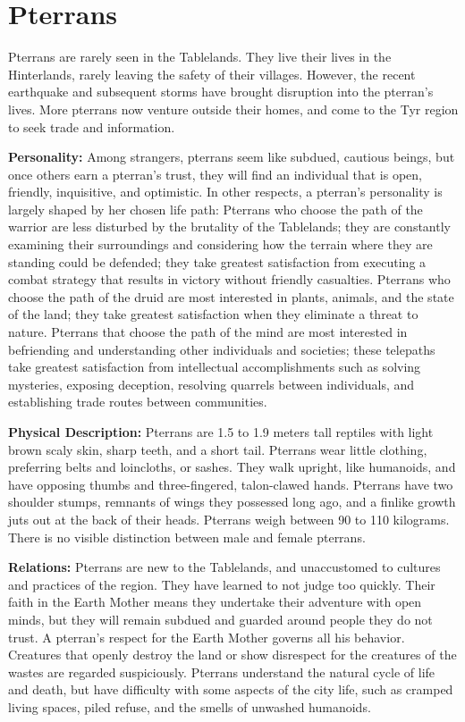\section{Pterrans}

Pterrans are rarely seen in the Tablelands. They live their lives in the Hinterlands, rarely leaving the safety of their villages. However, the recent earthquake and subsequent storms have brought disruption into the pterran's lives. More pterrans now venture outside their homes, and come to the Tyr region to seek trade and information.

\textbf{Personality:} Among strangers, pterrans seem like subdued, cautious beings, but once others earn a pterran's trust, they will find an individual that is open, friendly, inquisitive, and optimistic. In other respects, a pterran's personality is largely shaped by her chosen life path: Pterrans who choose the path of the warrior are less disturbed by the brutality of the Tablelands; they are constantly examining their surroundings and considering how the terrain where they are standing could be defended; they take greatest satisfaction from executing a combat strategy that results in victory without friendly casualties. Pterrans who choose the path of the druid are most interested in plants, animals, and the state of the land; they take greatest satisfaction when they eliminate a threat to nature. Pterrans that choose the path of the mind are most interested in befriending and understanding other individuals and societies; these telepaths take greatest satisfaction from intellectual accomplishments such as solving mysteries, exposing deception, resolving quarrels between individuals, and establishing trade routes between communities.

\textbf{Physical Description:} Pterrans are 1.5 to 1.9 meters tall reptiles with light brown scaly skin, sharp teeth, and a short tail. Pterrans wear little clothing, preferring belts and loincloths, or sashes. They walk upright, like humanoids, and have opposing thumbs and three-fingered, talon-clawed hands. Pterrans have two shoulder stumps, remnants of wings they possessed long ago, and a finlike growth juts out at the back of their heads. Pterrans weigh between 90 to 110 kilograms. There is no visible distinction between male and female pterrans.

\textbf{Relations:} Pterrans are new to the Tablelands, and unaccustomed to cultures and practices of the region. They have learned to not judge too quickly. Their faith in the Earth Mother means they undertake their adventure with open minds, but they will remain subdued and guarded around people they do not trust. A pterran's respect for the Earth Mother governs all his behavior. Creatures that openly destroy the land or show disrespect for the creatures of the wastes are regarded suspiciously. Pterrans understand the natural cycle of life and death, but have difficulty with some aspects of the city life, such as cramped living spaces, piled refuse, and the smells of unwashed humanoids.

